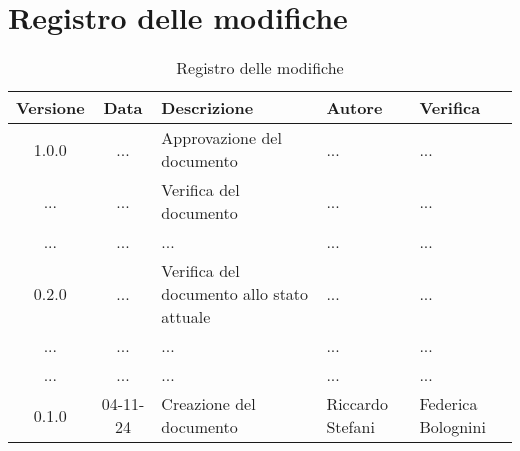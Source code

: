 

\section*{Registro delle modifiche}

\begin{table}[h]
    \centering
    \begin{tabular}{|c|c|p{5cm}|p{3cm}|p{3cm}|}
        \hline
        \rowcolor[gray]{0.9}
        \textbf{Versione} & \textbf{Data} & \textbf{Descrizione} & \textbf{Autore} & \textbf{Verifica}\\
        \hline
        1.0.0 & ... & Approvazione del documento & ... & ...\\
        \hline
        ... & ... & Verifica del documento & ... & ...\\
        \hline
        ... & ... & ... & ... & ...\\
        \hline
        0.2.0 & ... & Verifica del documento allo stato attuale & ... & ...\\
        \hline
        ... & ... & ... & ... & ...\\
        \hline
        ... & ... & ... & ... & ...\\
        \hline
        0.1.0 & 04-11-24 & Creazione del documento & Riccardo Stefani & Federica Bolognini\\
        \hline
    \end{tabular}
    \caption{Registro delle modifiche}
\end{table}
